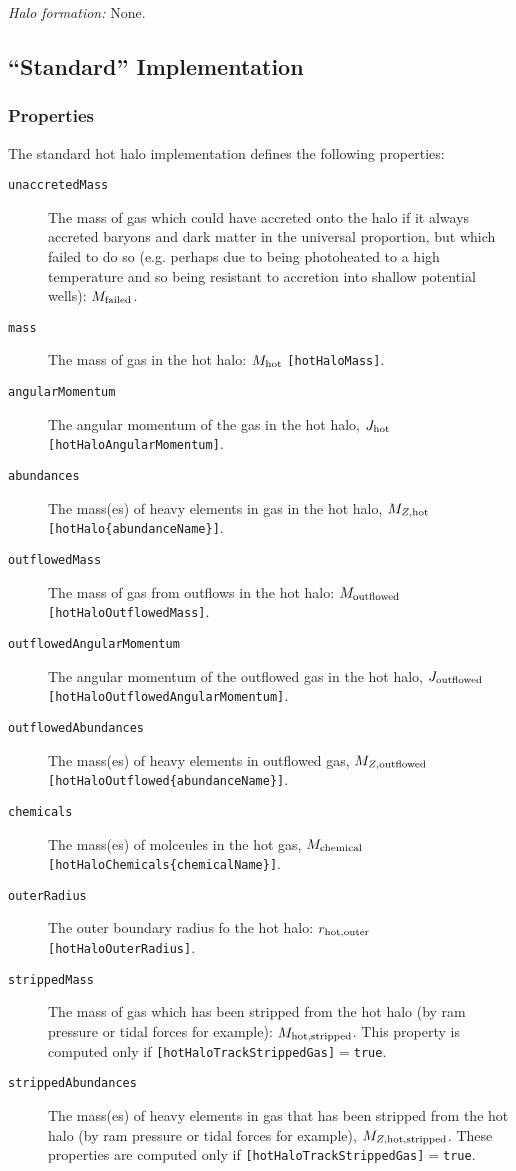 \noindent\emph{Halo formation:} None.\\

\subsection{``Standard'' Implementation}

\subsubsection{Properties}

The standard hot halo implementation defines the following properties:
\begin{description}
 \item [{\tt unaccretedMass}] The mass of gas which could have accreted onto the halo if it always accreted baryons and dark matter in the universal proportion, but which failed to do so (e.g. perhaps due to being photoheated to a high temperature and so being resistant to accretion into shallow potential wells): $M_{\rm failed}$.
 \item [{\tt mass}] The mass of gas in the hot halo: $M_{\rm hot}$ {\tt [hotHaloMass]}.
 \item [{\tt angularMomentum}] The angular momentum of the gas in the hot halo, $J_{\rm hot}$ {\tt [hotHaloAngularMomentum]}.
 \item [{\tt abundances}] The mass(es) of heavy elements in gas in the hot halo, $M_{Z, {\rm hot}}$ {\tt [hotHalo\{abundanceName\}]}.
 \item [{\tt outflowedMass}] The mass of gas from outflows in the hot halo: $M_{\rm outflowed}$ {\tt [hotHaloOutflowedMass]}.
 \item [{\tt outflowedAngularMomentum}] The angular momentum of the outflowed gas in the hot halo, $J_{\rm outflowed}$ {\tt [hotHaloOutflowedAngularMomentum]}.
 \item [{\tt outflowedAbundances}] The mass(es) of heavy elements in outflowed gas, $M_{Z, {\rm outflowed}}$ {\tt [hotHaloOutflowed\{abundanceName\}]}.
 \item [{\tt chemicals}] The mass(es) of molceules in the hot gas, $M_{\rm chemical}$ {\tt [hotHaloChemicals\{chemicalName\}]}.
 \item [{\tt outerRadius}] The outer boundary radius fo the hot halo: $r_{\rm hot, outer}$ {\tt [hotHaloOuterRadius]}.
 \item [{\tt strippedMass}] The mass of gas which has been stripped from the hot halo (by ram pressure or tidal forces for example): $M_{\rm hot, stripped}$. This property is computed only if {\tt [hotHaloTrackStrippedGas]}$=${\tt true}.
 \item [{\tt strippedAbundances}] The mass(es) of heavy elements in gas that has been stripped from the hot halo (by ram pressure or tidal forces for example), $M_{Z, {\rm hot, stripped}}$. These properties are computed only if {\tt [hotHaloTrackStrippedGas]}$=${\tt true}.
\end{description}
